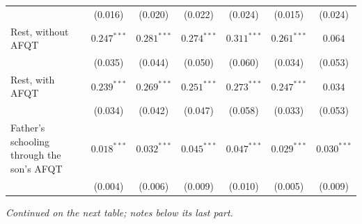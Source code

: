 \begin{table}[!htbp]
{{\begin{tabular}{lcccccc}
 & (0.016) & (0.020) & (0.022) & (0.024) & (0.015) & (0.024) \\
Rest, without AFQT & $0.247^{***}$ & $0.281^{***}$ & $0.274^{***}$ & $0.311^{***}$ & $0.261^{***}$ & $0.064$ \\
 & (0.035) & (0.044) & (0.050) & (0.060) & (0.034) & (0.053) \\
Rest, with AFQT & $0.239^{***}$ & $0.269^{***}$ & $0.251^{***}$ & $0.273^{***}$ & $0.247^{***}$ & $0.034$ \\
 & (0.034) & (0.042) & (0.047) & (0.058) & (0.033) & (0.053) \\
Father's schooling through the son's AFQT & $0.018^{***}$ & $0.032^{***}$ & $0.045^{***}$ & $0.047^{***}$ & $0.029^{***}$ & $0.030^{***}$ \\
 & (0.004) & (0.006) & (0.009) & (0.010) & (0.005) & (0.009) \\
\bottomrule
\end{tabular}}}
\par\smallskip
\begin{minipage}{\textwidth}\footnotesize \textit{Continued on the next table; notes below its last part.}\end{minipage}
\end{table}
